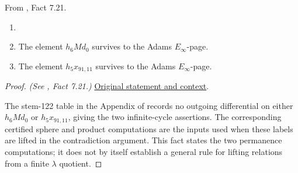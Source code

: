 \begin{fact}
\label{paper:7.21}
From \cite{LWX126}, Fact 7.21.\par
\label{fact:stem122}
\begin{enumerate}
    \item[] 
    \item The element $h_6 M d_0$ survives to the Adams $E_\infty$-page.
    \item The element $h_5x_{91,11}$ survives to the Adams $E_\infty$-page.
\end{enumerate}




\end{fact}
\begin{proof}
\textit{(See \cite{LWX126}, Fact 7.21.)} \href{paper/main.tex.html#L2689}{Original statement and context}.

The stem-122 table in the Appendix of \cite{LWX126} records no outgoing differential on either $h_6Md_0$ or $h_5x_{91,11}$, giving the two infinite-cycle assertions. The corresponding certified sphere and product computations are the inputs used when these labels are lifted in the contradiction argument. This fact states the two permanence computations; it does not by itself establish a general rule for lifting relations from a finite $\lambda$ quotient.
\end{proof}
